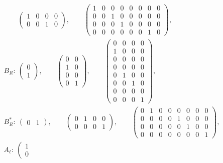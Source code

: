 \documentclass[pdftex]{sigma}
\numberwithin{equation}{section}
\begin{document}
\begin{gather*}
\qquad
 \left(
 \begin{matrix}
 1 & 0 & 0 & 0 \\
 0 & 0 & 1 & 0
 \end{matrix}
 \right),
\qquad
 \left(
 \begin{matrix}
 1 & 0 & 0 & 0 &0&0&0&0 \\
 0 & 0 & 1 & 0 &0&0&0&0 \\
 0 & 0 & 0 & 1 &0&0&0&0 \\
 0 & 0 & 0 & 0 &0&0&1&0
 \end{matrix}
 \right),
\\
B_R\colon \
 \left(
 \begin{matrix}
 0 \\
 1
 \end{matrix}
 \right),
\qquad
 \left(
 \begin{matrix}
 0 & 0 \\
 1 & 0 \\
 0 & 0 \\
 0 & 1
 \end{matrix}
 \right),
\qquad
 \left(
 \begin{matrix}
 0 & 0 & 0 & 0 \\
 1 & 0 & 0 & 0 \\
 0 & 0 & 0 & 0 \\
 0 & 0 & 0 & 0 \\
 0 & 1 & 0 & 0 \\
 0 & 0 & 1 & 0 \\
 0 & 0 & 0 & 0 \\
 0 & 0 & 0 & 1
 \end{matrix}
 \right),
\\
B^*_R\colon \
 \left(
 \begin{matrix}
 0 & 1
 \end{matrix}
 \right),
 \qquad
 \left(
 \begin{matrix}
 0 & 1 & 0 & 0\\
 0 & 0 & 0 & 1
 \end{matrix}
 \right),
\qquad
 \left(
 \begin{matrix}
 0 & 1 & 0 & 0 &0&0&0&0 \\
 0 & 0 & 0 & 0 &1&0&0&0 \\
 0 & 0 & 0 & 0 &0&1&0&0 \\
 0 & 0 & 0 & 0 &0&0&0&1
 \end{matrix}
 \right),
\\
A_\ell\colon \
 \left(
 \begin{matrix}
 1 \\
 0
 \end{matrix}

\end{gather*}
\end{document}
